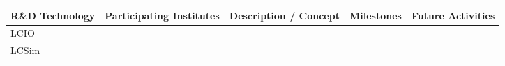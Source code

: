 \begin{landscape}
\begin{table}[h]
    \centering
    \begin{adjustbox}{max width=1\textwidth}
\begin{tabularx}{2\textwidth}{lXXXX}
    \toprule
    R\&D Technology & Participating Institutes & Description / Concept & Milestones & Future Activities \\
    \midrule
        LCIO &
        &
        &
        & \\
    \midrule
    LCSim &
    &
    &
    & \\
    \bottomrule
\end{tabularx}
\end{adjustbox}

\end{table}
\end{landscape}
\restoregeometry
